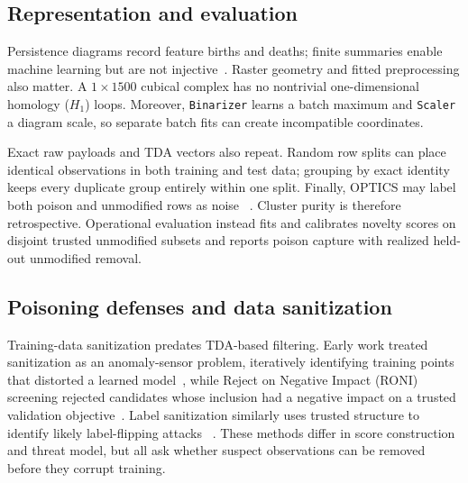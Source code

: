 \documentclass[conference]{IEEEtran}
\begin{document}
\subsection{Representation and evaluation}
Persistence diagrams record feature births and deaths; finite summaries enable
machine learning but are not injective~\cite{cohensteiner2007,tauzin2021}.
Raster geometry and fitted preprocessing also matter. A $1\times1500$ cubical
complex has no nontrivial one-dimensional homology ($H_1$) loops. Moreover, \texttt{Binarizer} learns a
batch maximum and \texttt{Scaler} a diagram scale, so separate batch fits can
create incompatible coordinates.

Exact raw payloads and TDA vectors also repeat. Random row splits can place
identical observations in both training and test data; grouping by exact
identity keeps every duplicate group entirely within one split.
Finally, OPTICS may label both poison and unmodified rows as noise
~\cite{ankerst1999}. Cluster purity is therefore retrospective. Operational
evaluation instead fits and calibrates novelty scores on disjoint trusted
unmodified subsets and reports poison capture with realized held-out
unmodified removal.

\subsection{Poisoning defenses and data sanitization}
Training-data sanitization predates TDA-based filtering. Early work treated
sanitization as an anomaly-sensor problem, iteratively identifying training
points that distorted a learned model~\cite{cretu2008}, while Reject on
Negative Impact (RONI)
screening rejected candidates whose inclusion had a negative impact on a
trusted validation objective~\cite{nelson2008}. Label sanitization similarly
uses trusted structure to identify likely label-flipping attacks
~\cite{paudice2018}. These methods differ in score construction and threat
model, but all ask whether suspect observations can be removed before they
corrupt training.
\end{document}

